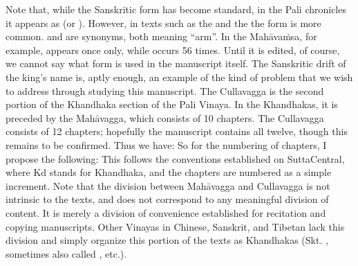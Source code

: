 {}Note that, while the Sanskritic form  has become standard, in the Pali chronicles it appears as  (or ). However, in texts such as the  and the  the form  is more common.  and  are synonyms, both meaning “arm”. In the Mahāvaṁsa, for example,  appears once only, while  occurs 56 times. Until it is edited, of course, we cannot say what form is used in the manuscript itself. The Sanskritic drift of the king’s name is, aptly enough, an example of the kind of problem that we wish to address through studying this manuscript.\markdownRendererInterblockSeparator
{}\markdownRendererInterblockSeparator
{}The Culla­vagga is the second portion of the Khandhaka section of the Pali Vinaya. In the Khandhakas, it is preceded by the Mahāvagga, which consists of 10 chapters. The Culla­vagga consists of 12 chapters; hopefully the manuscript contains all twelve, though this remains to be confirmed.\markdownRendererInterblockSeparator
{}Thus we have:\markdownRendererInterblockSeparator
{}\markdownRendererInterblockSeparator
{}So for the numbering of chapters, I propose the following:\markdownRendererInterblockSeparator
{}\markdownRendererBlockQuoteBegin
{}
\markdownRendererBlockQuoteEnd \markdownRendererInterblockSeparator
{}This follows the conventions established on SuttaCentral, where Kd stands for Khandhaka, and the chapters are numbered as a simple increment.\markdownRendererInterblockSeparator
{}Note that the division between Mahāvagga and Culla­vagga is not intrinsic to the texts, and does not correspond to any meaningful division of content. It is merely a division of convenience established for recitation and copying manuscripts. Other Vinayas in Chinese, Sanskrit, and Tibetan lack this division and simply organize this portion of the texts as Khandhakas (Skt. , sometimes also called , etc.).\markdownRendererInterblockSeparator

